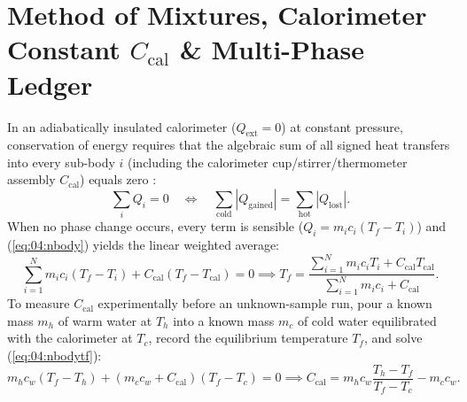 \section{Method of Mixtures, Calorimeter Constant $C_{\mathrm{cal}}$ \& Multi-Phase Ledger}
\label{sec:04.3}

In an adiabatically insulated calorimeter ($Q_{\mathrm{ext}} = 0$) at constant pressure, conservation of energy requires that the algebraic sum of all signed heat transfers into every sub-body $i$ (including the calorimeter cup/stirrer/thermometer assembly $C_{\mathrm{cal}}$) equals zero :
\begin{equation}\label{eq:04:nbody}
  \sum_{i} Q_i = 0 \quad\Longleftrightarrow\quad \sum_{\text{cold}} |Q_{\mathrm{gained}}| = \sum_{\text{hot}} |Q_{\mathrm{lost}}|.
\end{equation}
When no phase change occurs, every term is sensible ($Q_i = m_i c_i (T_f - T_i)$) and (\ref{eq:04:nbody}) yields the linear weighted average:
\begin{equation}\label{eq:04:nbodytf}
  \sum_{i=1}^N m_i c_i (T_f - T_i) + C_{\mathrm{cal}}(T_f - T_{\mathrm{cal}}) = 0 \implies
  T_f = \frac{\sum_{i=1}^N m_i c_i T_i + C_{\mathrm{cal}} T_{\mathrm{cal}}}{\sum_{i=1}^N m_i c_i + C_{\mathrm{cal}}}.
\end{equation}
To measure $C_{\mathrm{cal}}$ experimentally before an unknown-sample run, pour a known mass $m_h$ of warm water at $T_h$ into a known mass $m_c$ of cold water equilibrated with the calorimeter at $T_c$, record the equilibrium temperature $T_f$, and solve (\ref{eq:04:nbodytf}):
\begin{equation}\label{eq:04:ccal}
  m_h c_w (T_f - T_h) + (m_c c_w + C_{\mathrm{cal}})(T_f - T_c) = 0 \implies
  C_{\mathrm{cal}} = m_h c_w \frac{T_h - T_f}{T_f - T_c} - m_c c_w.
\end{equation}

